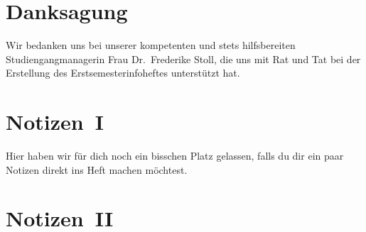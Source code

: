 \newpage
\section*{Danksagung}

Wir bedanken uns bei unserer kompetenten
und stets hilfsbereiten Studiengangmanagerin Frau Dr.~Frederike Stoll,
die uns mit Rat und Tat bei der Erstellung
des Erstsemesterinfoheftes unterstützt hat.

\section*{Notizen~I}

Hier haben wir für dich noch ein bisschen Platz gelassen,
falls du dir ein paar Notizen direkt ins Heft machen möchtest.

\newpage
\section*{Notizen~II}
